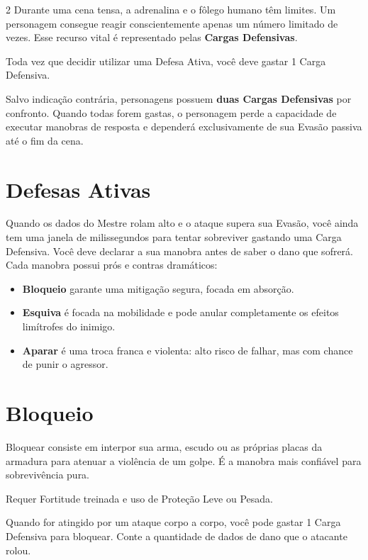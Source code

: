\documentclass[a4paper,11pt,openany]{book}
\begin{document}
\begin{multicols}{2}
Durante uma cena tensa, a adrenalina e o fôlego humano têm limites. Um personagem consegue reagir conscientemente apenas um número limitado de vezes. Esse recurso vital é representado pelas \textbf{Cargas Defensivas}.

\begin{regra}
Toda vez que decidir utilizar uma Defesa Ativa, você deve gastar 1 Carga Defensiva.
\end{regra}

Salvo indicação contrária, personagens possuem \textbf{duas Cargas Defensivas} por confronto. Quando todas forem gastas, o personagem perde a capacidade de executar manobras de resposta e dependerá exclusivamente de sua Evasão passiva até o fim  da cena.

\section{Defesas Ativas}

Quando os dados do Mestre rolam alto e o ataque supera sua Evasão, você ainda tem uma janela de milissegundos para tentar sobreviver gastando uma Carga Defensiva. 
Você deve declarar a sua manobra antes de saber o dano que sofrerá. Cada manobra possui prós e contras dramáticos:
\begin{itemize}
\item \textbf{Bloqueio} garante uma mitigação segura, focada em absorção.
\item \textbf{Esquiva} é focada na mobilidade e pode anular completamente os efeitos limítrofes do inimigo.
\item \textbf{Aparar} é uma troca franca e violenta: alto risco de falhar, mas com chance de punir o agressor.
\end{itemize}
\columnbreak
\section{Bloqueio}

Bloquear consiste em interpor sua arma, escudo ou as próprias placas da armadura para atenuar a violência de um golpe. É a manobra mais confiável para sobrevivência pura.

\begin{regra}
Requer Fortitude treinada e uso de Proteção Leve ou Pesada.
\end{regra}

Quando for atingido por um ataque corpo a corpo, você pode gastar 1 Carga Defensiva para bloquear. Conte a quantidade de dados de dano que o atacante rolou.


\end{multicols}
\end{document}
